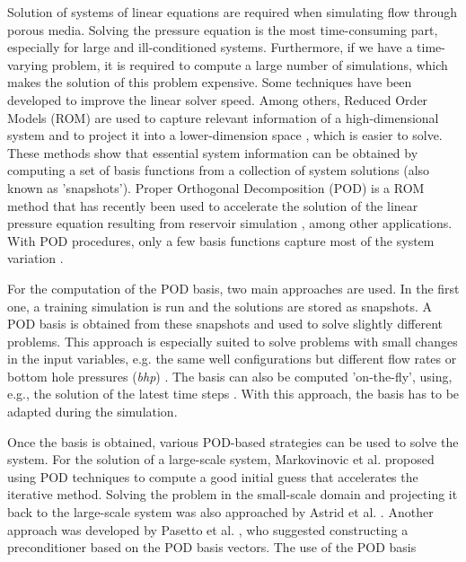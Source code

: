 \documentclass[12pt]{article}
\begin{document}
\hspace{0.5cm}Solution of systems of linear equations are required when 
simulating flow through porous media.
Solving the pressure equation is the most time-consuming part, especially for large and 
ill-conditioned systems. Furthermore, if we have a time-varying problem, it is required 
to compute a large number of simulations, which makes the solution of this problem expensive.
Some techniques have been developed to improve the linear solver speed. Among others, 
Reduced Order Models (ROM) are used to capture 
relevant information of a high-dimensional system and to project it into a lower-dimension 
space \cite{Vermeulen04,Pasetto16,Schilders08,Quarteroni14,Carlberg15}, which is easier to solve. 
These methods 
show that essential system information can be obtained by computing a set of basis 
functions from a collection of system solutions (also known as 'snapshots'). 
Proper Orthogonal Decomposition (POD) is a ROM method that has recently been used to  
accelerate the solution of the linear pressure equation resulting from reservoir simulation 
\cite{Astrid11,Mark06,Cardoso09,Heijn04,Doren06}, among other applications. 
With POD procedures, only a few basis functions capture most of the system variation 
\cite{Cardoso09}.\par
For the computation of the POD basis, two main approaches are used. In the first one, a training 
simulation is run and the solutions are stored as snapshots. 
A POD basis is obtained from these snapshots and used to solve slightly different problems. 
This approach is 
especially suited to solve problems with small changes in the input variables, e.g.
the same well configurations but different flow rates or bottom hole pressures (\emph{bhp}) \cite{Heijn04,Astrid11, Cardoso09}. 
The basis can also be computed 'on-the-fly', using, e.g., the solution of the latest time steps \cite{Mark06,Astrid11, Diaz17}. 
With this approach, the basis has to be adapted during the simulation. \par
Once the basis is obtained, various POD-based strategies can be used to solve the system.
For the 
solution of a large-scale system, Markovinovic et al. \cite{Mark06} proposed using POD techniques to compute a good 
initial guess that accelerates the iterative method. Solving the problem in the small-scale domain 
and projecting it back to the large-scale system
was also approached by Astrid et al. \cite{Astrid11}. Another approach was developed by Pasetto et 
al. \cite{Pasetto16}, who suggested constructing a preconditioner based on the POD basis vectors. The use of the POD basis 
\end{document}
